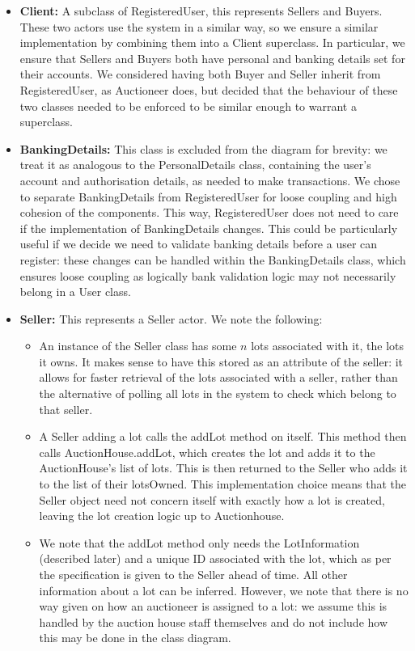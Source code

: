 \documentclass[titlepage, 12pt]{extarticle}
\begin{document}
\begin{itemize}
\item {\bf Client: } A subclass of RegisteredUser, this represents Sellers and Buyers. These two actors use the system in a similar way, so we ensure a similar implementation by combining them into a Client superclass. In particular, we ensure that Sellers and Buyers both have personal and banking details set for their accounts. We considered having both Buyer and Seller inherit from RegisteredUser, as Auctioneer does, but decided that the behaviour of these two classes needed to be enforced to be similar enough to warrant a superclass. 
\item {\bf BankingDetails: } This class is excluded from the diagram for brevity: we treat it as analogous to the PersonalDetails class, containing the user's account and authorisation details, as needed to make transactions. We chose to separate BankingDetails from RegisteredUser for loose coupling and high cohesion of the components. This way, RegisteredUser does not need to care if the implementation of BankingDetails changes. This could be particularly useful if we decide we need to validate banking details before a user can register: these changes can be handled within the BankingDetails class, which ensures loose coupling as logically bank validation logic may not necessarily belong in a User class. 
\item {\bf Seller: } This represents a Seller actor. We note the following:
  \begin{itemize}
  \item An instance of the Seller class has some $n$ lots associated with it, the lots it owns. It makes sense to have this stored as an attribute of the seller: it allows for faster retrieval of the lots associated with a seller, rather than the alternative of polling all lots in the system to check which belong to that seller. 
  \item A Seller adding a lot calls the addLot method on itself. This method then calls AuctionHouse.addLot, which creates the lot and adds it to the AuctionHouse's list of lots. This is then returned to the Seller who adds it to the list of their lotsOwned. This implementation choice means that the Seller object need not concern itself with exactly how a lot is created, leaving the lot creation logic up to Auctionhouse. 
  \item We note that the addLot method only needs the LotInformation (described later) and a unique ID associated with the lot, which as per the specification is given to the Seller ahead of time. All other information about a lot can be inferred. However, we note that there is no way given on how an auctioneer is assigned to a lot: we assume this is handled by the auction house staff themselves and do not include how this may be done in the class diagram.

\end{itemize}
\end{itemize}
\end{document}
